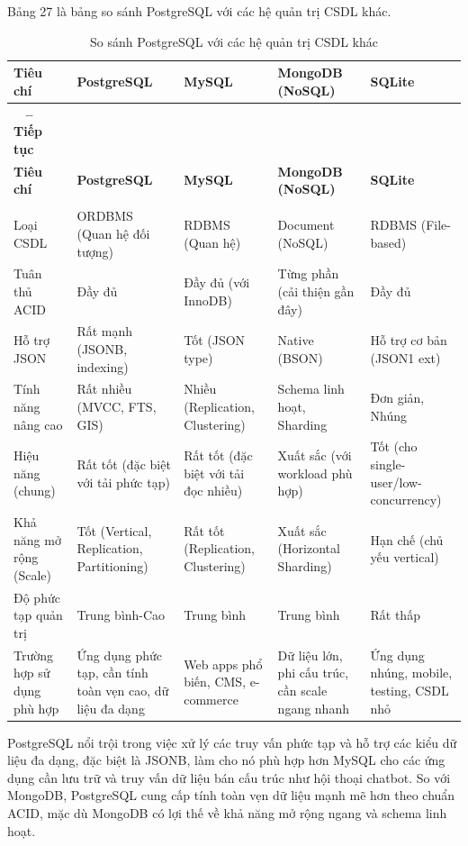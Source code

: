 \begin{enumerate}[label=\arabic*., font=\bfseries]
	Bảng 27 là bảng so sánh PostgreSQL với các hệ quản trị CSDL khác.

    \begin{longtable}{|>{\raggedright\arraybackslash}p{2.5cm}|>{\centering\arraybackslash}p{2.5cm}|>{\centering\arraybackslash}p{2.5cm}|>{\centering\arraybackslash}p{2.5cm}|>{\centering\arraybackslash}p{2.5cm}|}
        \caption{So sánh PostgreSQL với các hệ quản trị CSDL khác}\\
        \hline
        \textbf{Tiêu chí} & \textbf{PostgreSQL} & \textbf{MySQL} & \textbf{MongoDB (NoSQL)} & \textbf{SQLite} \\
        \hline \endfirsthead
        \multicolumn{5}{c}%
        {{\bfseries \tablename\ \thetable{} -- Tiếp tục}} \\
        \hline
        \textbf{Tiêu chí} & \textbf{PostgreSQL} & \textbf{MySQL} & \textbf{MongoDB (NoSQL)} & \textbf{SQLite} \\
        \hline \endhead
        \hline \multicolumn{5}{r}{{Tiếp tục ở trang sau}} \\ \endfoot
        \hline \endlastfoot
        Loại CSDL & ORDBMS (Quan hệ đối tượng) & RDBMS (Quan hệ) & Document (NoSQL) & RDBMS (File-based) \\
        \hline
        Tuân thủ ACID & Đầy đủ & Đầy đủ (với InnoDB) & Từng phần (cải thiện gần đây) & Đầy đủ \\
        \hline
        Hỗ trợ JSON & Rất mạnh (JSONB, indexing) & Tốt (JSON type) & Native (BSON) & Hỗ trợ cơ bản (JSON1 ext) \\
        \hline
        Tính năng nâng cao & Rất nhiều (MVCC, FTS, GIS) & Nhiều (Replication, Clustering) & Schema linh hoạt, Sharding & Đơn giản, Nhúng \\
        \hline
        Hiệu năng (chung) & Rất tốt (đặc biệt với tải phức tạp) & Rất tốt (đặc biệt với tải đọc nhiều) & Xuất sắc (với workload phù hợp) & Tốt (cho single-user/low-concurrency) \\
        \hline
        Khả năng mở rộng (Scale) & Tốt (Vertical, Replication, Partitioning) & Rất tốt (Replication, Clustering) & Xuất sắc (Horizontal Sharding) & Hạn chế (chủ yếu vertical) \\
        \hline
        Độ phức tạp quản trị & Trung bình-Cao & Trung bình & Trung bình & Rất thấp \\
        \hline
        Trường hợp sử dụng phù hợp & Ứng dụng phức tạp, cần tính toàn vẹn cao, dữ liệu đa dạng & Web apps phổ biến, CMS, e-commerce & Dữ liệu lớn, phi cấu trúc, cần scale ngang nhanh & Ứng dụng nhúng, mobile, testing, CSDL nhỏ \\
        \hline
    \end{longtable}
    PostgreSQL nổi trội trong việc xử lý các truy vấn phức tạp và hỗ trợ các kiểu dữ liệu đa dạng, đặc biệt là JSONB, làm cho nó phù hợp hơn MySQL cho các ứng dụng cần lưu trữ và truy vấn dữ liệu bán cấu trúc như hội thoại chatbot. So với MongoDB, PostgreSQL cung cấp tính toàn vẹn dữ liệu mạnh mẽ hơn theo chuẩn ACID, mặc dù MongoDB có lợi thế về khả năng mở rộng ngang và schema linh hoạt.


\end{enumerate}
